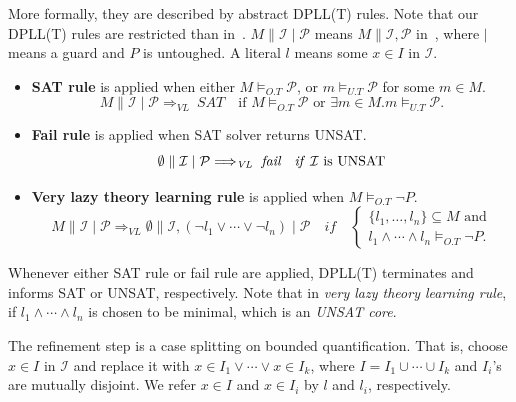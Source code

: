 \documentclass[runningheads,a4paper,oribibl]{llncs}
\begin{document}
More formally, they are described by abstract DPLL(T) rules. 
Note that our DPLL(T) rules are restricted than in~\cite{dpll}. 
$M \mathrel{\lVert} {\mathcal I} \mathrel{|} {\mathcal P}$ means 
$M \mathrel{\lVert} {\mathcal I}, {\mathcal P}$ in~\cite{dpll}, 
where $|$ means a guard and $P$ is untoughed. 
A literal $l$ means some $x \in I$ in ${\mathcal I}$. 
\begin{itemize}
\item \textbf{SAT rule} is applied when either $M \models_{O.T} {\mathcal P}$, 
or $m \models_{U.T} {\mathcal P}$ for some $m \in M$.
\[
M \mathrel{\lVert} {\mathcal I} \mathrel{|} {\mathcal P} \Longrightarrow_{\textit{VL}}~\textit{SAT} 
\quad\text{if $M \models_{O.T} {\mathcal P}$ or $\exists m \in M. m \models_{U.T} {\mathcal P}$.}
\]

\item \textbf{Fail rule} is applied when SAT solver returns UNSAT. 
\[
\emptyset \mathrel{\lVert} {\mathcal I} \mathrel{|} {\mathcal P} \Longrightarrow_{\textit{VL}}~\textit{fail} 
\quad\mbox{\textit{if} ${\mathcal I}$ is UNSAT}
\]

\item{\textbf{Very lazy theory learning rule} is applied when $M \models_{O.T} \neg P$.}
\[
M \mathrel{\lVert} {\mathcal I} \mathrel{|} {\mathcal P}  \Longrightarrow_{\textit{VL}}  
\emptyset \mathrel{\lVert}  {\mathcal I} , (\neg l_1 \vee \cdots \vee \neg l_n ) \mathrel{|} {\mathcal P}
\quad\textit{if}\quad
\begin{cases}
\text{$\{l_1,\ldots,l_n \} \subseteq M$ and} \\
\text{$l_1 \wedge \cdots \wedge l_n \models_{O.T}  \neg P$.}
\end{cases}
\]
\end{itemize}
Whenever either SAT rule or fail rule are applied, DPLL(T) terminates 
and informs SAT or UNSAT, respectively. 
Note that in \emph{very lazy theory learning rule}, if $l_1 \wedge \cdots \wedge l_n$ is 
chosen to be minimal, which is an \emph{UNSAT core}. 

The refinement step is a case splitting on bounded quantification. 
That is, choose $x \in I$ in ${\mathcal I}$ and replace it with
$x \in I_1 \vee \cdots \vee x \in I_k$, 
where $I = I_1 \cup \cdots \cup I_k$ and $I_i$'s are mutually disjoint. 
We refer $x \in I$ and $x \in I_i$ by $l$ and $l_i$, respectively. 
\end{document}
